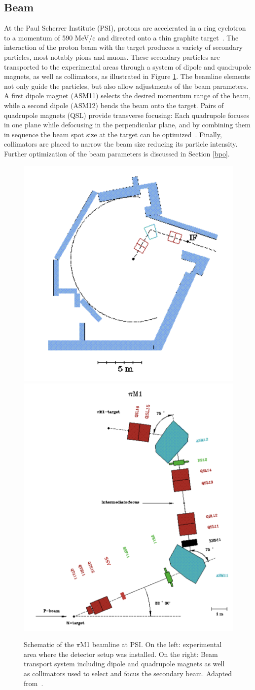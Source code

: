 \documentclass[11pt,a4paper]{article}
\begin{document}
\subsection{Beam}
At the Paul Scherrer Institute (PSI), protons are accelerated in a ring cyclotron to a momentum of 590 MeV/c and directed onto a thin graphite target~\cite{PSI cyclotron}. The interaction of the proton beam with the target produces a variety of secondary particles, most notably pions and muons. These secondary particles are transported to the experimental areas through a system of dipole and quadrupole magnets, as well as collimators, as illustrated in Figure \ref{piM1}. The beamline elements not only guide the particles, but also allow adjustments of the beam parameters. A first dipole magnet (ASM11) selects the desired momentum range of the beam, while a second dipole (ASM12) bends the beam onto the target. Pairs of quadrupole magnets (QSL) provide transverse focusing: Each quadrupole focuses in one plane while defocusing in the perpendicular plane, and by combining them in sequence the beam spot size at the target can be optimized~\cite{Povh}. Finally, collimators are placed to narrow the beam size reducing its particle intensity. Further optimization of the beam parameters is discussed in Section \ref{bpo}.

\begin{figure}[h]
    \centering
    \includegraphics[width=0.35\linewidth]{Experimental area.png}
    \includegraphics[width=0.45\linewidth]{PiM1.png}
    \caption{Schematic of the $\pi$M1 beamline at PSI. On the left: experimental area where the detector setup was installed. On the right: Beam transport system including dipole and quadrupole magnets as well as collimators used to select and focus the secondary beam. Adapted from~\cite{PSI PiM1}.}
    \label{piM1}
\end{figure}
\end{document}
